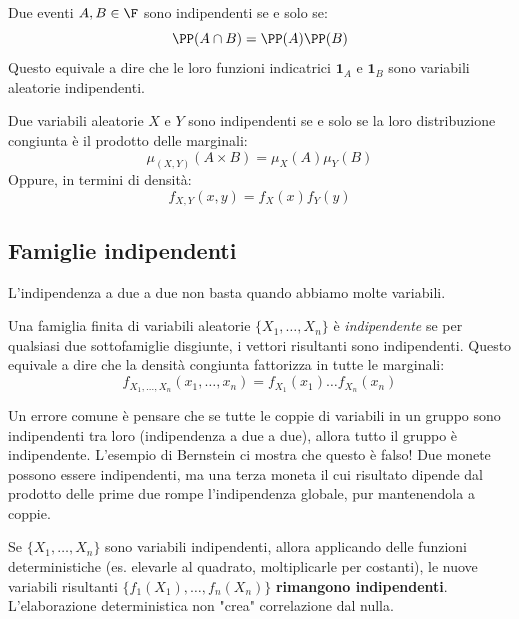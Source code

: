 \begin{definition}
Due eventi $A, B \in \F$ sono indipendenti se e solo se:
\[ \PP(A \cap B) = \PP(A)\PP(B) \]
Questo equivale a dire che le loro funzioni indicatrici $\mathbf{1}_A$ e $\mathbf{1}_B$ sono variabili aleatorie indipendenti.
\end{definition}
\begin{theorem}
Due variabili aleatorie $X$ e $Y$ sono indipendenti se e solo se la loro distribuzione congiunta è il prodotto delle marginali:
\[ \mu_{(X,Y)}(A \times B) = \mu_X(A)\mu_Y(B) \]
Oppure, in termini di densità:
\[ f_{X,Y}(x, y) = f_X(x)f_Y(y) \]
\end{theorem}

\subsection{Famiglie indipendenti}

L'indipendenza a due a due non basta quando abbiamo molte variabili.

\begin{definition}
Una famiglia finita di variabili aleatorie $\{X_1, \dots, X_n\}$ è \emph{indipendente} se per qualsiasi due sottofamiglie disgiunte, i vettori risultanti sono indipendenti. Questo equivale a dire che la densità congiunta fattorizza in tutte le marginali:
\[ f_{X_1, \dots, X_n}(x_1, \dots, x_n) = f_{X_1}(x_1) \dots f_{X_n}(x_n) \]
\end{definition}

\begin{spiegazione}
    Un errore comune è pensare che se tutte le coppie di variabili in un gruppo sono indipendenti tra loro (indipendenza a due a due), allora tutto il gruppo è indipendente. L'esempio di Bernstein ci mostra che questo è falso! Due monete possono essere indipendenti, ma una terza moneta il cui risultato dipende dal prodotto delle prime due rompe l'indipendenza globale, pur mantenendola a coppie.
\end{spiegazione}

\begin{theorem}
Se $\{X_1, \dots, X_n\}$ sono variabili indipendenti, allora applicando delle funzioni deterministiche (es. elevarle al quadrato, moltiplicarle per costanti), le nuove variabili risultanti $\{f_1(X_1), \dots, f_n(X_n)\}$ \textbf{rimangono indipendenti}. L'elaborazione deterministica non "crea" correlazione dal nulla.
\end{theorem}

